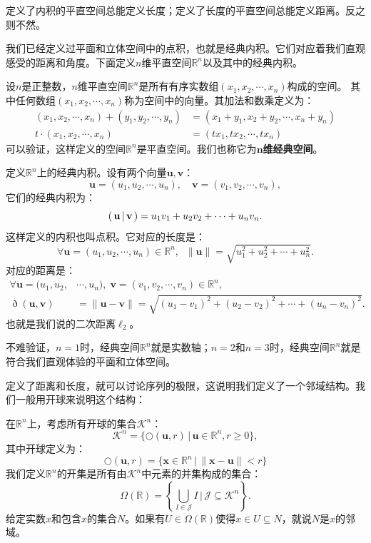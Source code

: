 \documentclass[12pt,UTF8,fontset=none]{ctexbook}
\begin{document}
\begin{appendix}
定义了内积的平直空间总能定义长度；定义了长度的平直空间总能定义距离。反之则不然。

我们已经定义过平面和立体空间中的点积，也就是经典内积。它们对应着我们直观感受的距离和角度。下面定义$n$维平直空间$\mathbb{R}^n$以及其中的经典内积。
\begin{df}
    设$n$是正整数，$n$维平直空间$\mathbb{R}^n$是所有有序实数组$(x_1, x_2, \cdots, x_n)$构成的空间。
    其中任何数组$(x_1, x_2, \cdots, x_n)$称为空间中的向量。其加法和数乘定义为：
    \begin{align*}
        (x_1, x_2, \cdots, x_n) + (y_1, y_2, \cdots, y_n) &= (x_1 + y_1, x_2 + y_2, \cdots, x_n + y_n) \\
        t\cdot (x_1, x_2, \cdots, x_n) &= (tx_1, tx_2, \cdots, t x_n)
    \end{align*}
    可以验证，这样定义的空间$\mathbb{R}^n$是平直空间。我们也称它为$\boldsymbol{n}$\textbf{维经典空间}。

    定义$\mathbb{R}^n$上的经典内积。设有两个向量$\mathbf{u}, \mathbf{v}$：
    $$ \mathbf{u} = (u_1, u_2, \cdots, u_n), \quad  \mathbf{v} = (v_1, v_2, \cdots, v_n), $$
    它们的经典内积为：
    $$ \displaystyle\left( \,\mathbf{u} \,\middle\vert \,\mathbf{v} \,\right) = u_1v_1 + u_2v_2 + \cdots + u_n v_n.$$
    这样定义的内积也叫点积。它对应的长度是：
    $$ \forall \mathbf{u} = (u_1, u_2, \cdots, u_n) \in \mathbb{R}^n, \;\; \| \mathbf{u}\| = \sqrt{u_1^2 + u_2^2 + \cdots + u_n^2} .$$
    对应的距离是：
    \begin{align*}
        \forall \mathbf{u} = (u_1, u_2, &\cdots, u_n), \; \mathbf{v} = (v_1, v_2, \cdots, v_n) \in \mathbb{R}^n, \\
        \eth(\mathbf{u}, \mathbf{v}) &= \| \mathbf{u} - \mathbf{v}\| = \sqrt{(u_1 - v_1)^2 + (u_2 - v_2)^2 + \cdots + (u_n - v_n)^2} .
    \end{align*}
    也就是我们说的二次距离$\ell_2$。
\end{df}
不难验证，$n=1$时，经典空间$\mathbb{R}^n$就是实数轴；$n=2$和$n=3$时，经典空间$\mathbb{R}^n$就是符合我们直观体验的平面和立体空间。

定义了距离和长度，就可以讨论序列的极限，这说明我们定义了一个邻域结构。我们一般用开球来说明这个结构：
\begin{df}
    在$\mathbb{R}^n$上，考虑所有开球的集合$\mathcal{K}^n$：
    $$ \mathcal{K}^n = \{ \bigcirc(\mathbf{u}, r) \, | \, \mathbf{u} \in \mathbb{R}^n, r \geqslant 0 \},$$
    其中开球定义为：
    $$ \bigcirc(\mathbf{u},r) = \{ \mathbf{x}\in \mathbb{R}^n\,|\, \| \mathbf{x} - \mathbf{u}\| < r\} $$
    我们定义$\mathbb{R}^n$的开集是所有由$\mathcal{K}^n$中元素的并集构成的集合：
    $$ \Omega(\mathbb{R}) = \left\{\bigcup_{I \in \mathcal{J}} I \, \Bigg| \,\mathcal{J} \subseteq  \mathcal{K}^n \right\}.$$
    给定实数$x$和包含$x$的集合$N$。如果有$U\in\Omega(\mathbb{R})$使得$x\in U\subseteq N$，就说$N$是$x$的邻域。


\end{df}
\end{appendix}
\end{document}
